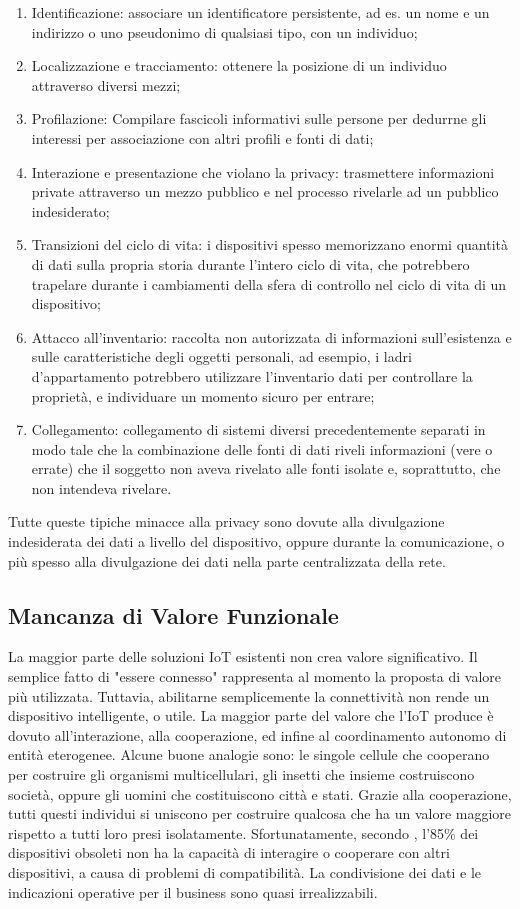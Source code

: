 \begin{enumerate}

	\item
	      Identificazione: associare un identificatore  persistente, ad es. un nome e un indirizzo o uno pseudonimo di qualsiasi tipo, con un individuo;
	\item
	      Localizzazione e tracciamento: ottenere la posizione di un individuo attraverso diversi mezzi;
	\item
	      Profilazione: Compilare fascicoli informativi sulle persone per dedurrne gli interessi per
	      associazione con altri profili e fonti di dati;
	\item
	      Interazione e presentazione che violano la privacy: trasmettere informazioni private attraverso un mezzo pubblico e nel processo rivelarle ad un pubblico indesiderato;
	\item
	      Transizioni del ciclo di vita: i dispositivi spesso memorizzano enormi quantità di dati sulla propria storia durante l'intero ciclo di vita, che potrebbero trapelare durante i cambiamenti della sfera di controllo nel ciclo di vita di un dispositivo;
	\item
	      Attacco all'inventario: raccolta non autorizzata di informazioni sull'esistenza e sulle caratteristiche degli oggetti personali, ad esempio, i ladri d'appartamento potrebbero utilizzare l'inventario dati per controllare la proprietà, e individuare un momento sicuro per entrare;
	\item
	      Collegamento: collegamento di sistemi diversi precedentemente separati in modo tale che la combinazione delle fonti di dati riveli informazioni (vere o errate) che il soggetto non aveva rivelato alle fonti isolate e, soprattutto, che non intendeva rivelare.
\end{enumerate}
Tutte queste tipiche minacce alla privacy sono dovute alla divulgazione indesiderata dei dati a livello del dispositivo, oppure  durante la comunicazione, o più spesso alla divulgazione dei dati nella parte centralizzata della rete.

\subsection{Mancanza di Valore Funzionale}
La maggior parte delle soluzioni IoT esistenti non crea valore significativo. Il semplice fatto di "essere connesso" rappresenta al momento la proposta di valore più utilizzata. Tuttavia, abilitarne semplicemente la connettività non rende un dispositivo intelligente, o utile. La maggior parte del valore che l'IoT produce è dovuto all'interazione, alla cooperazione, ed infine al coordinamento autonomo di entità eterogenee. Alcune buone analogie sono: le singole cellule che cooperano per costruire gli organismi multicellulari, gli insetti che insieme costruiscono società, oppure gli uomini che costituiscono città e stati. Grazie alla cooperazione, tutti questi individui si uniscono per costruire qualcosa che ha un valore maggiore rispetto a tutti loro presi isolatamente. Sfortunatamente, secondo \cite{c29}, l'85\% dei dispositivi obsoleti non ha la capacità di interagire o cooperare con altri dispositivi, a causa di problemi di compatibilità. La condivisione dei dati e le indicazioni operative per il business sono quasi irrealizzabili.
